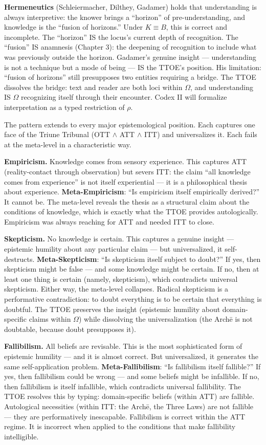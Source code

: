 \documentclass[10pt, openany, oneside]{book}
\begin{document}
\textbf{Hermeneutics} (Schleiermacher, Dilthey, Gadamer) holds that understanding is always interpretive: the knower brings a ``horizon'' of pre-understanding, and knowledge is the ``fusion of horizons.'' Under $K \equiv B$, this is correct and incomplete. The ``horizon'' IS the locus's current depth of recognition. The ``fusion'' IS anamnesis (Chapter 3): the deepening of recognition to include what was previously outside the horizon. Gadamer's genuine insight --- understanding is not a technique but a mode of being --- IS the TTOE's position. His limitation: ``fusion of horizons'' still presupposes two entities requiring a bridge. The TTOE dissolves the bridge: text and reader are both loci within $\Omega$, and understanding IS $\Omega$ recognizing itself through their encounter. Codex II will formalize interpretation as a typed restriction of $\rho$.

The pattern extends to every major epistemological position. Each captures one face of the Triune Tribunal (OTT $\wedge$ ATT $\wedge$ ITT) and universalizes it. Each fails at the meta-level in a characteristic way.

\textbf{Empiricism.} Knowledge comes from sensory experience. This captures ATT (reality-contact through observation) but severs ITT: the claim ``all knowledge comes from experience'' is not itself experiential --- it is a philosophical thesis about experience. \textbf{Meta-Empiricism}: ``Is empiricism itself empirically derived?'' It cannot be. The meta-level reveals the thesis as a structural claim about the conditions of knowledge, which is exactly what the TTOE provides autologically. Empiricism was always reaching for ATT and needed ITT to close.

\textbf{Skepticism.} No knowledge is certain. This captures a genuine insight --- epistemic humility about any particular claim --- but universalized, it self-destructs. \textbf{Meta-Skepticism}: ``Is skepticism itself subject to doubt?'' If yes, then skepticism might be false --- and some knowledge might be certain. If no, then at least one thing is certain (namely, skepticism), which contradicts universal skepticism. Either way, the meta-level collapses. Radical skepticism is a performative contradiction: to doubt everything is to be certain that everything is doubtful. The TTOE preserves the insight (epistemic humility about domain-specific claims within $\Omega$) while dissolving the universalization (the Arch\={e} is not doubtable, because doubt presupposes it).

\textbf{Fallibilism.} All beliefs are revisable. This is the most sophisticated form of epistemic humility --- and it is almost correct. But universalized, it generates the same self-application problem. \textbf{Meta-Fallibilism}: ``Is fallibilism itself fallible?'' If yes, then fallibilism could be wrong --- and some beliefs might be infallible. If no, then fallibilism is itself infallible, which contradicts universal fallibility. The TTOE resolves this by typing: domain-specific beliefs (within ATT) are fallible. Autological necessities (within ITT: the Arch\={e}, the Three Laws) are not fallible --- they are performatively inescapable. Fallibilism is correct within the ATT regime. It is incorrect when applied to the conditions that make fallibility intelligible.
\end{document}
